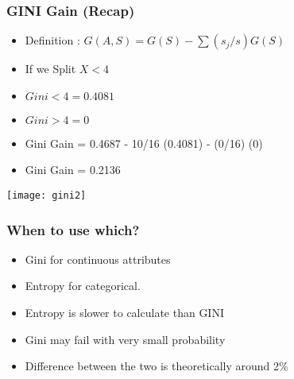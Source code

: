 \begin{frame}[fragile]\frametitle{GINI Gain (Recap)}
\begin{itemize}
\item Definition :
$G(A,S) = G(S) - \sum (s_j/s)G(S)$
\item If we Split $X < 4$
\item   $Gini < 4 = 0.4081$
\item $Gini > 4 = 0$
\item Gini Gain = 0.4687 - 10/16 (0.4081) - (0/16) (0)
\item Gini Gain = 0.2136
\end{itemize}
\begin{center}
\texttt{[image: gini2]}
\end{center}

\end{frame}


\begin{frame}[fragile]\frametitle{When to use which?}
\begin{itemize}
\item  Gini for continuous attributes
\item   Entropy for categorical.
\item  Entropy is slower to calculate than GINI
\item  Gini may fail with very small probability
\item  Difference between the two is theoretically around 2\%
\end{itemize}
\end{frame}

